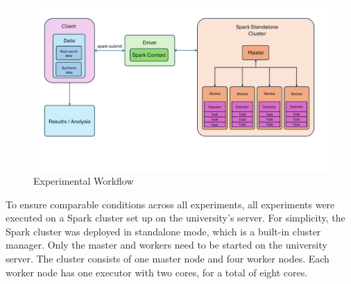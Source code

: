 \begin{figure}[H]
    \centering
    \includegraphics[width=\linewidth]{images/Workflow_image.pdf}
    \caption{Experimental Workflow}
    \label{fig:workflow}
\end{figure}
To ensure comparable conditions across all experiments, all experiments were executed on a Spark cluster set up on the university's server. For simplicity, the Spark cluster was deployed in standalone mode, which is a built-in cluster manager. Only the master and workers need to be started on the university server. The cluster consists of one master node and four worker nodes. Each worker node has one executor with two cores, for a total of eight cores. \par


